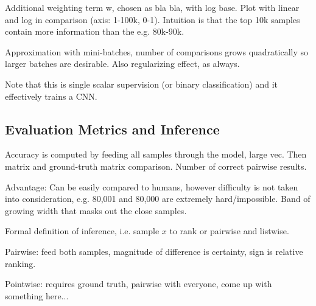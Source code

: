 Additional weighting term w, chosen as bla bla, with log base. Plot with linear and log in comparison (axis: 1-100k, 0-1). Intuition is that the top 10k samples contain more information than the e.g. 80k-90k.

Approximation with mini-batches, number of comparisons grows quadratically so larger batches are desirable. Also regularizing effect, as always.

Note that this is single scalar supervision (or binary classification) and it effectively trains a CNN.

\subsection{Evaluation Metrics and Inference}

Accuracy is computed by feeding all samples through the model, large vec. Then matrix and ground-truth matrix comparison. Number of correct pairwise results.

Advantage: Can be easily compared to humans, however difficulty is not taken into consideration, e.g. 80,001 and 80,000 are extremely hard/impossible. Band of growing width that masks out the close samples.

Formal definition of inference, i.e. sample $x$ to rank or pairwise and listwise. 

Pairwise: feed both samples, magnitude of difference is certainty, sign is relative ranking.

Pointwise: requires ground truth, pairwise with everyone, come up with something here...
